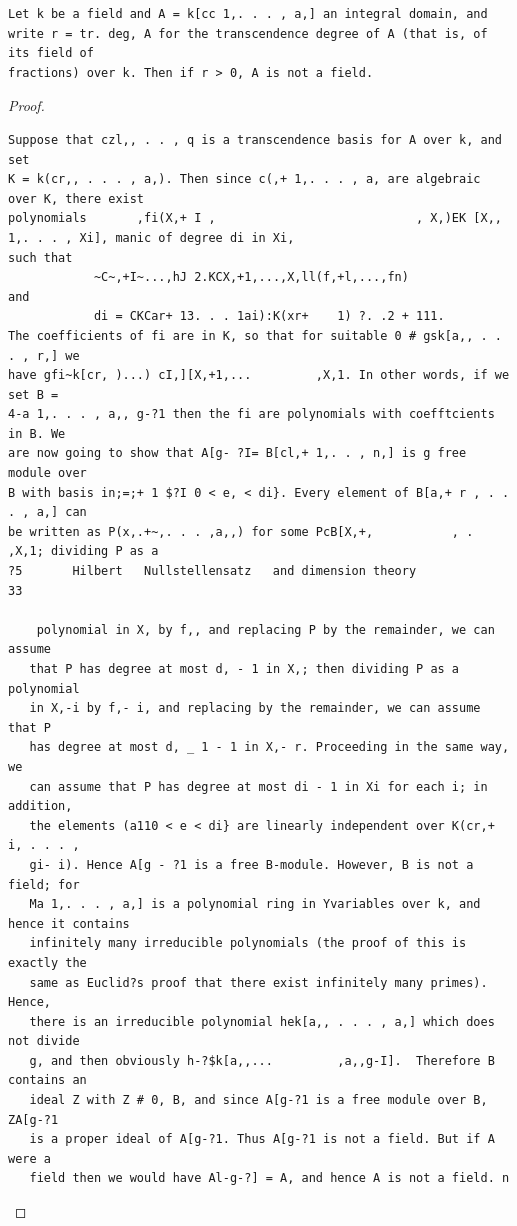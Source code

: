 \begin{theorem}\label{mcrt-auto-theorem-5-2}\uses{}
\begin{verbatim}
Let k be a field and A = k[cc 1,. . . , a,] an integral domain, and
write r = tr. deg, A for the transcendence degree of A (that is, of its field of
fractions) over k. Then if r > 0, A is not a field.
\end{verbatim}
\end{theorem}
\begin{proof}
\begin{verbatim}
Suppose that czl,, . . , q is a transcendence basis for A over k, and set
K = k(cr,, . . . , a,). Then since c(,+ 1,. . . , a, are algebraic over K, there exist
polynomials       ,fi(X,+ I ,                            , X,)EK [X,,                1,. . . , Xi], manic of degree di in Xi,
such that
            ~C~,+I~...,hJ 2.KCX,+1,...,X,ll(f,+l,...,fn)
and
            di = CKCar+ 13. . . 1ai):K(xr+    1) ?. .2 + 111.
The coefficients of fi are in K, so that for suitable 0 # gsk[a,, . . . , r,] we
have gfi~k[cr, )...) cI,][X,+1,...         ,X,1. In other words, if we set B =
4-a 1,. . . , a,, g-?1 then the fi are polynomials with coefftcients in B. We
are now going to show that A[g- ?I= B[cl,+ 1,. . , n,] is g free module over
B with basis in;=;+ 1 $?I 0 < e, < di}. Every element of B[a,+ r , . . . , a,] can
be written as P(x,.+~,. . . ,a,,) for some PcB[X,+,           , . ,X,1; dividing P as a
?5       Hilbert   Nullstellensatz   and dimension theory                       33

    polynomial in X, by f,, and replacing P by the remainder, we can assume
   that P has degree at most d, - 1 in X,; then dividing P as a polynomial
   in X,-i by f,- i, and replacing by the remainder, we can assume that P
   has degree at most d, _ 1 - 1 in X,- r. Proceeding in the same way, we
   can assume that P has degree at most di - 1 in Xi for each i; in addition,
   the elements (a110 < e < di} are linearly independent over K(cr,+ i, . . . ,
   gi- i). Hence A[g - ?1 is a free B-module. However, B is not a field; for
   Ma 1,. . . , a,] is a polynomial ring in Yvariables over k, and hence it contains
   infinitely many irreducible polynomials (the proof of this is exactly the
   same as Euclid?s proof that there exist infinitely many primes). Hence,
   there is an irreducible polynomial hek[a,, . . . , a,] which does not divide
   g, and then obviously h-?$k[a,,...         ,a,,g-I].  Therefore B contains an
   ideal Z with Z # 0, B, and since A[g-?1 is a free module over B, ZA[g-?1
   is a proper ideal of A[g-?1. Thus A[g-?1 is not a field. But if A were a
   field then we would have Al-g-?] = A, and hence A is not a field. n
\end{verbatim}
\end{proof}


